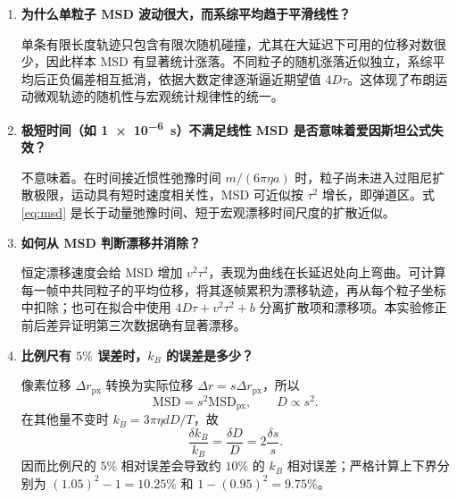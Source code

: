 \documentclass[11pt]{article}
\begin{document}
\begin{enumerate}
    \item \textbf{为什么单粒子 MSD 波动很大，而系综平均趋于平滑线性？}

    单条有限长度轨迹只包含有限次随机碰撞，尤其在大延迟下可用的位移对数很少，因此样本 MSD 有显著统计涨落。不同粒子的随机涨落近似独立，系综平均后正负偏差相互抵消，依据大数定律逐渐逼近期望值 $4D\tau$。这体现了布朗运动微观轨迹的随机性与宏观统计规律性的统一。

    \item \textbf{极短时间（如 \SI{1e-6}{s}）不满足线性 MSD 是否意味着爱因斯坦公式失效？}

    不意味着。在时间接近惯性弛豫时间 $m/(6\pi\eta a)$ 时，粒子尚未进入过阻尼扩散极限，运动具有短时速度相关性，MSD 可近似按 $\tau^2$ 增长，即弹道区。式 \eqref{eq:msd} 是长于动量弛豫时间、短于宏观漂移时间尺度的扩散近似。

    \item \textbf{如何从 MSD 判断漂移并消除？}

    恒定漂移速度会给 MSD 增加 $v^2\tau^2$，表现为曲线在长延迟处向上弯曲。可计算每一帧中共同粒子的平均位移，将其逐帧累积为漂移轨迹，再从每个粒子坐标中扣除；也可在拟合中使用 $4D\tau+v^2\tau^2+b$ 分离扩散项和漂移项。本实验修正前后差异证明第三次数据确有显著漂移。

    \item \textbf{比例尺有 $5\%$ 误差时，$k_B$ 的误差是多少？}

    像素位移 $\Delta r_{\mathrm{px}}$ 转换为实际位移 $\Delta r=s\Delta r_{\mathrm{px}}$，所以
    \begin{equation}
        \mathrm{MSD}=s^2\mathrm{MSD}_{\mathrm{px}},\qquad D\propto s^2.
    \end{equation}
    在其他量不变时 $k_B=3\pi\eta dD/T$，故
    \begin{equation}
        \frac{\delta k_B}{k_B}
        =\frac{\delta D}{D}
        =2\frac{\delta s}{s}.
    \end{equation}
    因而比例尺的 $5\%$ 相对误差会导致约 $10\%$ 的 $k_B$ 相对误差；严格计算上下界分别为 $(1.05)^2-1=10.25\%$ 和 $1-(0.95)^2=9.75\%$。
\end{enumerate}
\end{document}
